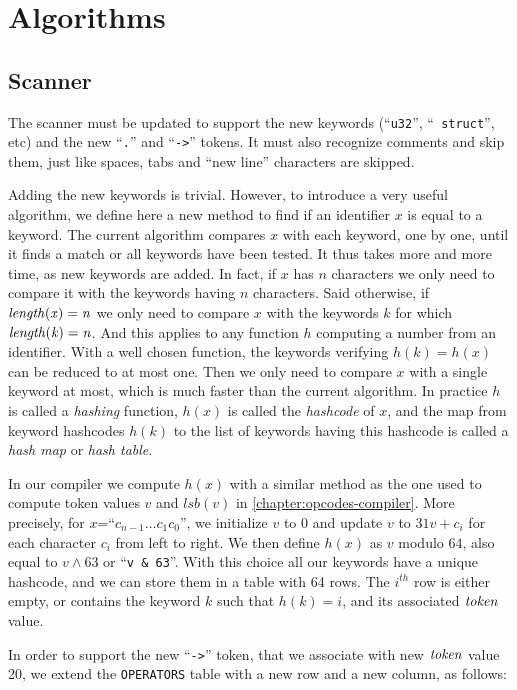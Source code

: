 \section{Algorithms}

\subsection{Scanner}\label{subsection:toyc4-scanner}

The scanner must be updated to support the new keywords (``{\tt u32}'', ``{\tt
struct}'', etc) and the new ``{\tt .}'' and ``{\tt ->}'' tokens. It must also
recognize comments and skip them, just like spaces, tabs and ``new line''
characters are skipped.

Adding the new keywords is trivial. However, to introduce a very useful
algorithm, we define here a new method to find if an identifier $x$ is equal to
a keyword. The current algorithm compares $x$ with each keyword, one by one,
until it finds a match or all keywords have been tested. It thus takes more and
more time, as new keywords are added. In fact, if $x$ has $n$ characters we
only need to compare it with the keywords having $n$ characters. Said
otherwise, if $\it{length}(x)=n$ we only need to compare $x$ with the keywords
$k$ for which $\it{length}(k)=n$. And this applies to any function $h$
computing a number from an identifier. With a well chosen function, the
keywords verifying $h(k)=h(x)$ can be reduced to at most one. Then we only need
to compare $x$ with a single keyword at most, which is much faster than the
current algorithm. In practice $h$ is called a {\em hashing} function, $h(x)$
is called the {\em hashcode} of $x$, and the map from keyword hashcodes $h(k)$
to the list of keywords having this hashcode is called a {\em hash map} or {\em
hash table}.

In our compiler we compute $h(x)$ with a similar method as the one used to
compute token values $v$ and $lsb(v)$ in \cref{chapter:opcodes-compiler}. More
precisely, for $x$=``$c_{n-1}\ldots c_1c_0$'', we initialize $v$ to 0 and
update $v$ to $31v+c_i$ for each character $c_i$ from left to right. We then
define $h(x)$ as $v$ modulo $64$, also equal to $v \wedge 63$ or ``{\tt v \&
63}''. With this choice all our keywords have a unique hashcode, and we can
store them in a table with 64 rows. The $i^{th}$ row is either empty, or
contains the keyword $k$ such that $h(k)=i$, and its associated $\it{token}$
value.

In order to support the new ``{\tt ->}'' token, that we associate with new
$\it{token}$ value 20, we extend the {\tt OPERATORS} table with a new
row and a new column, as follows:

